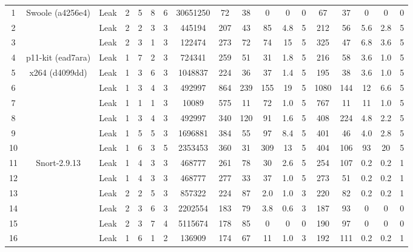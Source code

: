 \begin{table*}[t!]
\begin{tabular}{c|c|c|c|c|c|c|c|c|c|c|c|c|c|c|c|c|c}
\\ \hline\hline
1 & \multirow{3}{*}{Swoole (a4256e4)} & Leak & 2 & 5 & 8 & 6 & 30651250 & 72 & 38 & 0 & 0 & 0 & 67 & 37 & 0 & 0 & 0 \\ 
2 &                                   & Leak & 2 & 2 & 3 & 3 & 445194 & 207 & 43 & 85 & 4.8 & 5  & 212 & 56 & 5.6 & 2.8 & 5 \\
3 &                                   & Leak & 2 & 3 & 1 & 3 & 122474 & 273 & 72 & 74 & 15 & 5 & 325 & 47 & 6.8 & 3.6 & 5  \\ \hline
4 & p11-kit (ead7ara)                 & Leak & 1 & 7 & 2 & 3 & 724341 & 259 & 51 & 31 & 1.8 & 5 & 216 & 58 & 3.6 & 1.0 & 5 \\ \hline
5 & \multirow{6}{*}{x264 (d4099dd)}   & Leak & 1 & 3 & 6 & 3 & 1048837 & 224 & 36 & 37 & 1.4 & 5 & 195 & 38 & 3.6 & 1.0 & 5 \\ 
6 &                                   & Leak & 1 & 3 & 4 & 3 & 492997 & 864 & 239 & 155 & 19 & 5 & 1080 & 144 & 12 & 6.6 & 5 \\ 
7 &                                   & Leak & 1 & 1 & 1 & 3 & 10089 & 575 & 11 & 72 & 1.0 & 5 & 767 & 11 & 11 & 1.0 & 5 \\ 
8 &                                   & Leak & 1 & 3 & 4 & 3 & 492997 & 340 & 120 & 91 & 1.6 & 5 & 408 & 224 & 4.8 & 2.2 & 5 \\ 
9 &                                   & Leak & 1 & 5 & 5 & 3 & 1696881 & 384 & 55 & 97 & 8.4 & 5 & 401 & 46 & 4.0 & 2.8 & 5 \\ 
10 &                                  & Leak & 1 & 6 & 3 & 5 & 2353453 & 360 & 31 & 309 & 13 & 5 & 404 & 106 & 93 & 20 & 5 \\ \hline
11 & \multirow{8}{*}{Snort-2.9.13}    & Leak & 1 & 4 & 3 & 3 & 468777 & 261 & 78 & 30 & 2.6 & 5 & 254 & 107 & 0.2 & 0.2 & 1 \\ 
12 &                                  & Leak & 1 & 4 & 3 & 3 & 468777 & 277 & 33 & 37 & 1.0 & 5 & 273 & 51 & 0.2 & 0.2 & 1 \\ 
13 &                                  & Leak & 2 & 2 & 5 & 3 & 857322 & 224 & 87 & 2.0 & 1.0 & 3 & 220 & 82 & 0.2 & 0.2 & 1 \\ 
14 &                                  & Leak & 2 & 3 & 6 & 3 & 2202554 & 183 & 79 & 3.8 & 0.6 & 3 & 187 & 93 & 0 & 0 & 0 \\ 
15 &                                  & Leak & 2 & 3 & 7 & 4 & 5115674 & 178 & 85 & 0 & 0 & 0 & 190 & 97 & 0 & 0 & 0 \\ 
16 &                                  & Leak & 1 & 6 & 1 & 2 & 136909 & 174 & 67 & 11 & 1.0 & 3 & 192 & 111 & 0.2 & 0.2 & 1 \\ 

\end{tabular}
\end{table*}
